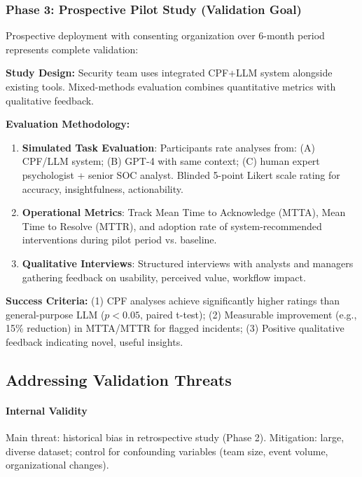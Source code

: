 \documentclass[11pt, a4paper]{article}
\begin{document}
\subsubsection{Phase 3: Prospective Pilot Study (Validation Goal)}

Prospective deployment with consenting organization over 6-month period represents complete validation:

\textbf{Study Design:} Security team uses integrated CPF+LLM system alongside existing tools. Mixed-methods evaluation combines quantitative metrics with qualitative feedback.

\textbf{Evaluation Methodology:}
\begin{enumerate}
\item \textbf{Simulated Task Evaluation}: Participants rate analyses from: (A) CPF/LLM system; (B) GPT-4 with same context; (C) human expert psychologist + senior SOC analyst. Blinded 5-point Likert scale rating for accuracy, insightfulness, actionability.

\item \textbf{Operational Metrics}: Track Mean Time to Acknowledge (MTTA), Mean Time to Resolve (MTTR), and adoption rate of system-recommended interventions during pilot period vs. baseline.

\item \textbf{Qualitative Interviews}: Structured interviews with analysts and managers gathering feedback on usability, perceived value, workflow impact.
\end{enumerate}

\textbf{Success Criteria:} (1) CPF analyses achieve significantly higher ratings than general-purpose LLM ($p < 0.05$, paired t-test); (2) Measurable improvement (e.g., 15\% reduction) in MTTA/MTTR for flagged incidents; (3) Positive qualitative feedback indicating novel, useful insights.

\subsection{Addressing Validation Threats}

\paragraph{Internal Validity}
Main threat: historical bias in retrospective study (Phase 2). Mitigation: large, diverse dataset; control for confounding variables (team size, event volume, organizational changes).
\end{document}
